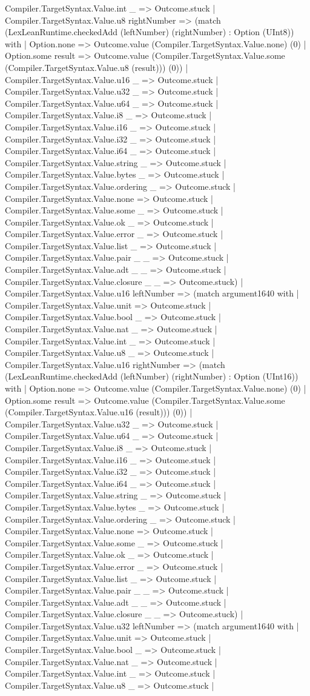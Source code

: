 \documentclass[11pt]{article}
\begin{document}
Compiler.TargetSyntax.Value.int \_ => Outcome.stuck | Compiler.TargetSyntax.Value.u8 rightNumber => (match (LexLeanRuntime.checkedAdd (leftNumber) (rightNumber) : Option (UInt8)) with | Option.none => Outcome.value (Compiler.TargetSyntax.Value.none) (0) | Option.some result => Outcome.value (Compiler.TargetSyntax.Value.some (Compiler.TargetSyntax.Value.u8 (result))) (0)) | Compiler.TargetSyntax.Value.u16 \_ => Outcome.stuck | Compiler.TargetSyntax.Value.u32 \_ => Outcome.stuck | Compiler.TargetSyntax.Value.u64 \_ => Outcome.stuck | Compiler.TargetSyntax.Value.i8 \_ => Outcome.stuck | Compiler.TargetSyntax.Value.i16 \_ => Outcome.stuck | Compiler.TargetSyntax.Value.i32 \_ => Outcome.stuck | Compiler.TargetSyntax.Value.i64 \_ => Outcome.stuck | Compiler.TargetSyntax.Value.string \_ => Outcome.stuck | Compiler.TargetSyntax.Value.bytes \_ => Outcome.stuck | Compiler.TargetSyntax.Value.ordering \_ => Outcome.stuck | Compiler.TargetSyntax.Value.none => Outcome.stuck | Compiler.TargetSyntax.Value.some \_ => Outcome.stuck | Compiler.TargetSyntax.Value.ok \_ => Outcome.stuck | Compiler.TargetSyntax.Value.error \_ => Outcome.stuck | Compiler.TargetSyntax.Value.list \_ => Outcome.stuck | Compiler.TargetSyntax.Value.pair \_ \_ => Outcome.stuck | Compiler.TargetSyntax.Value.adt \_ \_ => Outcome.stuck | Compiler.TargetSyntax.Value.closure \_ \_ => Outcome.stuck) | Compiler.TargetSyntax.Value.u16 leftNumber => (match argument1640 with | Compiler.TargetSyntax.Value.unit => Outcome.stuck | Compiler.TargetSyntax.Value.bool \_ => Outcome.stuck | Compiler.TargetSyntax.Value.nat \_ => Outcome.stuck | Compiler.TargetSyntax.Value.int \_ => Outcome.stuck | Compiler.TargetSyntax.Value.u8 \_ => Outcome.stuck | Compiler.TargetSyntax.Value.u16 rightNumber => (match (LexLeanRuntime.checkedAdd (leftNumber) (rightNumber) : Option (UInt16)) with | Option.none => Outcome.value (Compiler.TargetSyntax.Value.none) (0) | Option.some result => Outcome.value (Compiler.TargetSyntax.Value.some (Compiler.TargetSyntax.Value.u16 (result))) (0)) | Compiler.TargetSyntax.Value.u32 \_ => Outcome.stuck | Compiler.TargetSyntax.Value.u64 \_ => Outcome.stuck | Compiler.TargetSyntax.Value.i8 \_ => Outcome.stuck | Compiler.TargetSyntax.Value.i16 \_ => Outcome.stuck | Compiler.TargetSyntax.Value.i32 \_ => Outcome.stuck | Compiler.TargetSyntax.Value.i64 \_ => Outcome.stuck | Compiler.TargetSyntax.Value.string \_ => Outcome.stuck | Compiler.TargetSyntax.Value.bytes \_ => Outcome.stuck | Compiler.TargetSyntax.Value.ordering \_ => Outcome.stuck | Compiler.TargetSyntax.Value.none => Outcome.stuck | Compiler.TargetSyntax.Value.some \_ => Outcome.stuck | Compiler.TargetSyntax.Value.ok \_ => Outcome.stuck | Compiler.TargetSyntax.Value.error \_ => Outcome.stuck | Compiler.TargetSyntax.Value.list \_ => Outcome.stuck | Compiler.TargetSyntax.Value.pair \_ \_ => Outcome.stuck | Compiler.TargetSyntax.Value.adt \_ \_ => Outcome.stuck | Compiler.TargetSyntax.Value.closure \_ \_ => Outcome.stuck) | Compiler.TargetSyntax.Value.u32 leftNumber => (match argument1640 with | Compiler.TargetSyntax.Value.unit => Outcome.stuck | Compiler.TargetSyntax.Value.bool \_ => Outcome.stuck | Compiler.TargetSyntax.Value.nat \_ => Outcome.stuck | Compiler.TargetSyntax.Value.int \_ => Outcome.stuck | Compiler.TargetSyntax.Value.u8 \_ => Outcome.stuck | 
\end{document}
